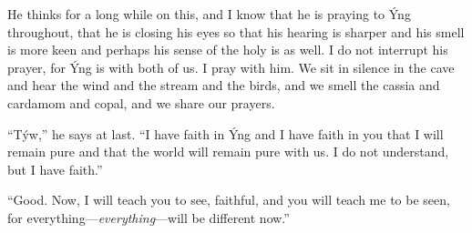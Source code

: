 He thinks for a long while on this, and I know that he is praying to Ýng throughout, that he is closing his eyes so that his hearing is sharper and his smell is more keen and perhaps his sense of the holy is as well. I do not interrupt his prayer, for Ýng is with both of us. I pray with him. We sit in silence in the cave and hear the wind and the stream and the birds, and we smell the cassia and cardamom and copal, and we share our prayers.

``Týw,'' he says at last. ``I have faith in Ýng and I have faith in you that I will remain pure and that the world will remain pure with us. I do not understand, but I have faith.''

``Good. Now, I will teach you to see, faithful, and you will teach me to be seen, for everything---\emph{everything}---will be different now.''
